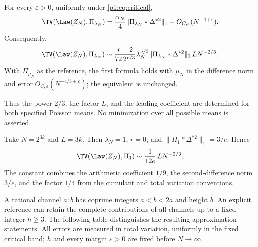 \begin{corollary}
\label{p1:cor:tv}
For every \(\varepsilon>0\), uniformly under \eqref{p1:eq:critical},
\begin{equation}
 \TV(\Law(Z_N),\Pi_{\lambda_N})
 =\frac{\alpha_N}{4}\|\Pi_{\lambda_N}*\Delta^{*2}\|_1
       +O_{C,\varepsilon}(N^{-1+\varepsilon}).
 \label{p1:eq:tv-main}
\end{equation}
Consequently,
\begin{equation}
 \TV(\Law(Z_N),\Pi_{\lambda_N})
 \sim\frac{r+2}{72\,2^{r/3}}\lambda_N^{5/3}
       \|\Pi_{\lambda_N}*\Delta^{*2}\|_1\,L N^{-2/3}.
 \label{p1:eq:tv-equiv}
\end{equation}
With \(\Pi_{\mu_N}\) as the reference, the first formula holds with
\(\mu_N\) in the difference norm and error
\(O_{C,\varepsilon}(N^{-4/3+\varepsilon})\); the equivalent is
unchanged.
\end{corollary}

Thus the power \(2/3\), the factor \(L\), and the leading coefficient
are determined for both specified Poisson means. No minimization over
all possible means is asserted.

\begin{example}
\label{p1:ex:unit}
Take \(N=2^{3k}\) and \(L=3k\). Then \(\lambda_N=1\), \(r=0\),
and \(\|\Pi_1*\Delta^{*2}\|_1=3/e\). Hence
\begin{equation}
 \TV(\Law(Z_N),\Pi_1)
       \sim\frac{1}{12e}\,L N^{-2/3}.
 \label{p1:eq:unit-example}
\end{equation}
The constant combines the arithmetic coefficient \(1/9\), the
second-difference norm \(3/e\), and the factor \(1/4\) from the
cumulant and total variation conventions.
\end{example}

A rational channel $a:b$ has coprime integers $a<b<2a$ and height $b$.
An explicit reference can retain the complete contributions of all
channels up to a fixed integer $h\ge3$. The following table distinguishes
the resulting approximation statements. All errors are measured in
total variation, uniformly in the fixed critical band; $h$ and every
margin $\varepsilon>0$ are fixed before $N\to\infty$.


